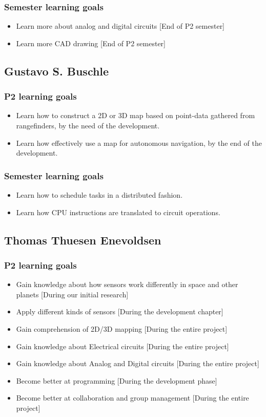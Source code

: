 \subsubsection{Semester learning goals}
\begin{itemize}
	\item Learn more about analog and digital circuits [End of P2 semester]
	\item Learn more CAD drawing [End of P2 semester]
\end{itemize}

\subsection{Gustavo S. Buschle}
\subsubsection{P2 learning goals}
\begin{itemize}
	\item Learn how to construct a 2D or 3D map based on point-data gathered from rangefinders, by the need of the development.
	\item Learn how effectively use a map for autonomous navigation, by the end of the development.
\end{itemize}
\subsubsection{Semester learning goals}
\begin{itemize}
	\item Learn how to schedule tasks in a distributed fashion.
	\item Learn how CPU instructions are translated to circuit operations.
\end{itemize}

\subsection{Thomas Thuesen Enevoldsen}
\subsubsection{P2 learning goals}
\begin{itemize}
	\item Gain knowledge about how sensors work differently in space and other planets [During our initial research]
	\item Apply different kinds of sensors [During the development chapter]
	\item Gain comprehension of 2D/3D mapping [During the entire project]
	\item Gain knowledge about Electrical circuits [During the entire project]
	\item Gain knowledge about Analog and Digital circuits [During the entire project]
	\item Become better at programming [During the development phase]
	\item Become better at collaboration and group management [During the entire project]
\end{itemize}
